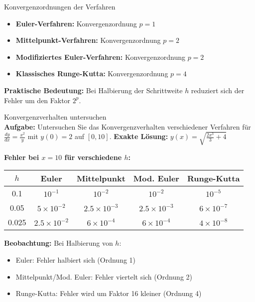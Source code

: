 \begin{concept}{Konvergenzordnungen der Verfahren}
\begin{itemize}
    \item \textbf{Euler-Verfahren:} Konvergenzordnung $p = 1$
    \item \textbf{Mittelpunkt-Verfahren:} Konvergenzordnung $p = 2$
    \item \textbf{Modifiziertes Euler-Verfahren:} Konvergenzordnung $p = 2$
    \item \textbf{Klassisches Runge-Kutta:} Konvergenzordnung $p = 4$
\end{itemize}

\textbf{Praktische Bedeutung:} Bei Halbierung der Schrittweite $h$ reduziert sich der Fehler um den Faktor $2^p$.
\end{concept}

\begin{example2}{Konvergenzverhalten untersuchen}\\
\textbf{Aufgabe:} Untersuchen Sie das Konvergenzverhalten verschiedener Verfahren für $\frac{dy}{dx} = \frac{x^2}{y}$ mit $y(0) = 2$ auf $[0, 10]$.
\tcblower
\textbf{Exakte Lösung:} $y(x) = \sqrt{\frac{2x^3}{3} + 4}$

\textbf{Fehler bei $x = 10$ für verschiedene $h$:}

\begin{center}
\begin{tabular}{|c|c|c|c|c|}
\hline
$h$ & Euler & Mittelpunkt & Mod. Euler & Runge-Kutta \\
\hline
0.1 & $10^{-1}$ & $10^{-2}$ & $10^{-2}$ & $10^{-5}$ \\
\hline
0.05 & $5 \times 10^{-2}$ & $2.5 \times 10^{-3}$ & $2.5 \times 10^{-3}$ & $6 \times 10^{-7}$ \\
\hline
0.025 & $2.5 \times 10^{-2}$ & $6 \times 10^{-4}$ & $6 \times 10^{-4}$ & $4 \times 10^{-8}$ \\
\hline
\end{tabular}
\end{center}

\textbf{Beobachtung:} Bei Halbierung von $h$:
\begin{itemize}
    \item Euler: Fehler halbiert sich (Ordnung 1)
    \item Mittelpunkt/Mod. Euler: Fehler viertelt sich (Ordnung 2)
    \item Runge-Kutta: Fehler wird um Faktor 16 kleiner (Ordnung 4)
\end{itemize}
\end{example2}

